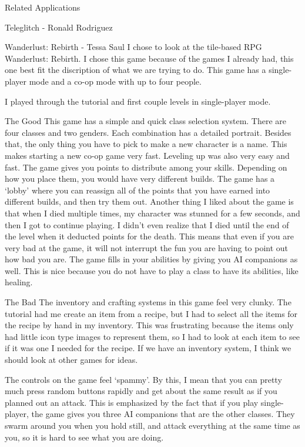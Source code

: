 \documentclass[12pt]{report}
\begin{document}
\begin{section}{Related Applications}
\begin{subsection}{Teleglitch - Ronald Rodriguez}
\end{subsection}

\begin{subsection}{Wanderlust: Rebirth - Tessa Saul}
I chose to look at the tile-based RPG Wanderlust: Rebirth. I chose this
game because of the games I already had, this one best fit the discription
of what we are trying to do. This game has a single-player mode and a co-op
mode with up to four people. 

I played through the tutorial and first couple levels in single-player
mode. 

\begin{subsubsection}{The Good}
This game has a simple and quick class selection system. There are four
classes and two genders. Each combination has a detailed portrait. Besides
that, the only thing you have to pick to make a new character is a name. 
This makes starting a new co-op game very fast.  
Leveling up was also very easy and fast. The game gives you points to
distribute among your skills. Depending on how you place them, you would 
have very different builds. The game has a `lobby' where you can
reassign all of the points that you have earned into different builds, and
then try them out. Another thing I liked about the game is that when I died
multiple times, my character was stunned for a few seconds, and then I got
to continue playing. I didn't even realize that I died until the end of
the level when it deducted points for the death. This means that even if
you are very bad at the game, it will not interrupt the fun you are having
to point out how bad you are. The game fills in your abilities by giving
you AI companions as well. This is nice because you do not have to play a
class to have its abilities, like healing. 
\end{subsubsection}

\begin{subsubsection}{The Bad}
The inventory and crafting systems in this game feel very clunky. The
tutorial had me create an item from a recipe, but I had to select all the
items for the recipe by hand in my inventory. This was frustrating because
the items only had little icon type images to represent them, so I had to
look at each item to see if it was one I needed for the recipe. If we have
an inventory system, I think we should look at other games for ideas. 

The controls on the game feel `spammy'. By this, I mean that you can pretty
much press random buttons rapidly and get about the same result as if you
planned out an attack. This is emphasized by the fact that if you play
single-player, the game gives you three AI companions that are the other
classes. They swarm around you when you hold still, and attack everything
at the same time as you, so it is hard to see what you are doing. 
\end{subsubsection}
\end{subsection}


\end{section}
\end{document}
